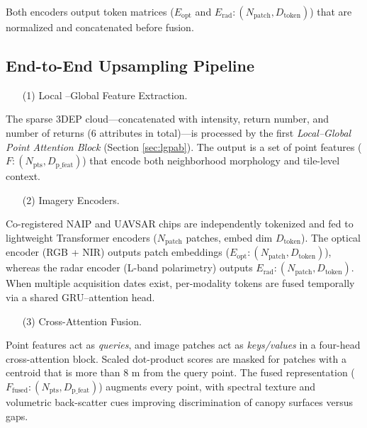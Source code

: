 \documentclass[remotesensing,article,accept,pdftex,moreauthors]{Definitions/mdpi}
\renewcommand{\hl}[1]{#1}
\begin{document}
Both encoders output token matrices ($E_{\text{opt}}$ and $E_{\text{rad}}: (N_{\text{patch}}, D_{\text{token}})$) that are normalized and concatenated before fusion.

\newpage

\subsection{End-to-End Upsampling Pipeline}
\label{sec:pipeline}


\begin{enumerate}
\item[(1)] {\hl{Local}%
–Global Feature Extraction.}
\end{enumerate}

The sparse 3DEP cloud—concatenated with intensity, return number, and number of returns (6 attributes in total)—is processed by the first \emph{\hl{Local–Global Point Attention Block}} (Section \ref{sec:lgpab}). The output is a set of point features ($F: (N_{\text{pts}}, D_{\text{p\_feat}})$) that encode both neighborhood morphology and tile-level context.


\begin{enumerate}
\item[(2)] {Imagery Encoders.}
\end{enumerate}

Co-registered NAIP and UAVSAR chips are independently tokenized and fed to lightweight Transformer encoders ($N_{\text{patch}}$ patches, embed dim $D_{\text{token}}$). The optical encoder (RGB + NIR) outputs patch embeddings ($E_{\text{opt}}: (N_{\text{patch}}, D_{\text{token}})$), whereas the radar encoder (L-band polarimetry) outputs $E_{\text{rad}}: (N_{\text{patch}}, D_{\text{token}})$. When multiple acquisition dates exist, per-modality tokens are fused temporally via a shared GRU–attention head.

\begin{enumerate}
\item[(3)] {Cross-Attention Fusion.}
\end{enumerate}

Point features act as \emph{queries}, and image patches act as \emph{\hl{keys/values}} %
in a four-head cross-attention block.
Scaled dot-product scores are masked for patches with a centroid that is more than 8 m from the query point. The fused representation ($F_{\text{fused}}: (N_{\text{pts}}, D_{\text{p\_feat}})$) augments every point, with spectral texture and volumetric back-scatter cues improving discrimination of canopy surfaces versus gaps.
\end{document}
